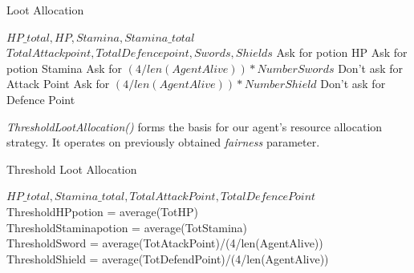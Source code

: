 \begin{algorithm}
\caption{Loot Allocation}\label{alg:31}
\begin{algorithmic} 
\scriptsize
\Require $HP\_total, HP, Stamina, Stamina\_total$
\Require $TotalAttackpoint, TotalDefencepoint, Swords, Shields$
\State  Ask for potion HP
\EndIf
{}
\State Ask for potion Stamina
\Else
{}
\State Ask for $(4/len(AgentAlive))*NumberSwords$
\Else
\State Don't ask for Attack Point
\EndIf
{}
\State Ask for $(4/len(AgentAlive))*NumberShield$
\Else
\State Don't ask for Defence Point
\EndIf
\EndIf
\end{algorithmic}
\end{algorithm}


\textit{ThresholdLootAllocation()} forms the basis for our agent's resource allocation strategy. It operates on previously obtained \textit{fairness} parameter. 



\begin{algorithm}
\caption{Threshold Loot Allocation}\label{alg:32}
\begin{algorithmic} 
\scriptsize
\Require $HP\_total, Stamina\_total, TotalAttackPoint,TotalDefencePoint$
ThresholdHPpotion =  average(TotHP)\\
ThresholdStaminapotion =  average(TotStamina)\\
ThresholdSword = average(TotAtackPoint)/(4/len(AgentAlive))\\
ThresholdShield = average(TotDefendPoint)/(4/len(AgentAlive))\\
\end{algorithmic}
\end{algorithm}


